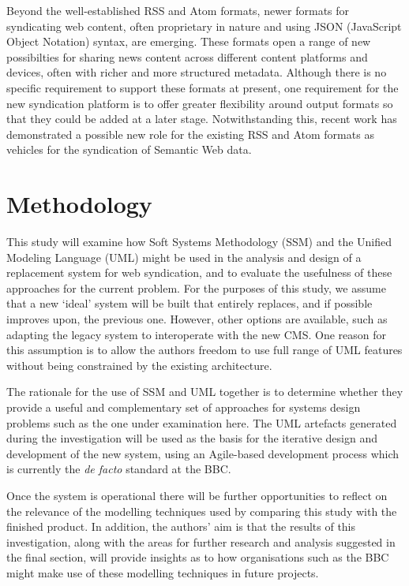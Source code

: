 \documentclass[runningheads,a4paper]{llncs}
\begin{document}
Beyond the well-established RSS and Atom formats, newer formats for syndicating web content, often proprietary in nature and using JSON (JavaScript Object Notation) syntax, are emerging. These formats open a range of new possibilties for sharing news content across different content platforms and devices, often with richer and more structured metadata. Although there is no specific requirement to support these formats at present, one requirement for the new syndication platform is to offer greater flexibility around output formats so that they could be added at a later stage. Notwithstanding this, recent work \cite{stolz} has demonstrated a possible new role for the existing RSS and Atom formats as vehicles for the syndication of Semantic Web data.


\section{Methodology}

This study will examine how Soft Systems Methodology (SSM) and the Unified Modeling Language (UML) might be used in the analysis and design of a replacement system for web syndication, and to evaluate the usefulness of these approaches for the current problem. For the purposes of this study, we assume that a new `ideal' system will be built that entirely replaces, and if possible improves upon, the previous one. However, other options are available, such as adapting the legacy system to interoperate with the new CMS. One reason for this assumption is to allow the authors freedom to use full range of UML features without being constrained by the existing architecture.

The rationale for the use of SSM and UML together is to determine whether they provide a useful and complementary set of approaches for systems design problems such as the one under examination here. The UML artefacts generated during the investigation will be used as the basis for the iterative design and development of the new system, using an Agile-based development process which is currently the \textit{de facto} standard at the BBC.

Once the system is operational there will be further opportunities to reflect on the relevance of the modelling techniques used by comparing this study with the finished product. In addition, the authors' aim is that the results of this investigation, along with the areas for further research and analysis suggested in the final section, will provide insights as to how organisations such as the BBC might make use of these modelling techniques in future projects.
\end{document}
